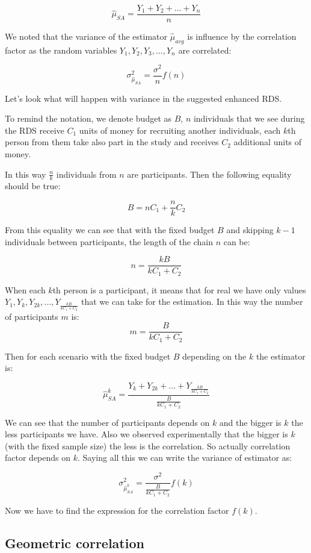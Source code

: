 \documentclass[12pt]{report}
\begin{document}
$$ \widehat{\mu}_{SA} = \frac{Y_1 + Y_2 + ... + Y_n}{n}$$

We noted that the variance of the estimator $\widehat{\mu}_{avg}$ is influence by the correlation factor as the random variables $Y_1, Y_2, Y_3,..., Y_n$ are correlated:

$$ \sigma^2_{\hat{\mu}_{SA}} = \frac{\sigma^2}{n} f(n)$$

Let's look what will happen with variance in the suggested enhanced RDS.

To remind the notation, we denote budget as $B$, $n$ individuals that we see during the RDS receive $C_1$ units of money for recruiting another individuals, each $k$th person from them take also part in the study and receives $C_2$ additional units of money. 

In this way $\frac{n}{k}$ individuals from $n$ are participants. Then the following equality should be true:

$$B = nC_1 + \frac{n}{k}C_2$$

From this equality we can see that with the fixed budget $B$ and skipping $k-1$ individuals between participants, the length of the chain $n$ can be:

$$n = \frac{kB}{kC_1 + C_2}$$

When each $k$th person is a participant, it means that for real we have only values $Y_1, Y_k, Y_{2k}, ..., Y_{\frac{kB}{kC_1 + C_2}}$ that we can take for the estimation. In this way the number of participants $m$ is:
$$m = \frac{B}{kC_1 + C_2}$$

Then for each scenario with the fixed budget $B$ depending on the $k$ the estimator is:

$$ \widehat{\mu}_{SA}^k = \frac{Y_k+ Y_{2k}+ ...+ Y_{\frac{kB}{kC_1 + C_2}}}{\frac{B}{kC_1 + C_2}}$$


We can see that the number of participants depends on $k$ and the bigger is $k$ the less participants we have.
Also we observed experimentally that the bigger is $k$ (with the fixed sample size) the less is the correlation. So actually correlation factor  depends on $k$.
Saying all this we can write the variance of estimator as:

$$ \sigma^2_{\hat{\mu}_{SA}^k} = \frac{\sigma^2}{\frac{B}{kC_1 + C_2}} f(k)$$


Now we have to find the expression for the correlation factor $f(k)$.

\subsection{Geometric correlation}
\end{document}
